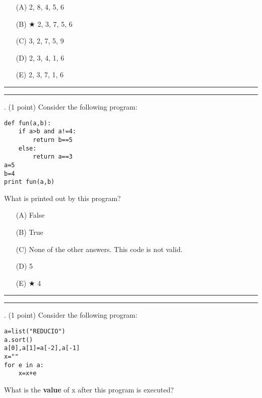 \documentclass{article}
\begin{document}
\begin{enumerate}
\item[(A)]
2, 8, 4, 5, 6

\item[(B)] $\bigstar$ 
2, 3, 7, 5, 6

\item[(C)]
3, 2, 7, 5, 9

\item[(D)]
2, 3, 4, 1, 6

\item[(E)]
2, 3, 7, 1, 6

\end{enumerate}

\vspace*{2em}
\hrule
\vspace{2em}

\vspace{2em}
\hrule height 2pt


\newpage
{}. (1 point)
Consider the following program:
\begin{verbatim}
def fun(a,b):
    if a>b and a!=4:
        return b==5
    else:
        return a==3
a=5
b=4
print fun(a,b)
\end{verbatim}
What is printed out by this program?


\begin{enumerate}
\item[(A)]
False

\item[(B)]
True

\item[(C)]
None of the other answers. This code is not valid.

\item[(D)]
5

\item[(E)] $\bigstar$ 
4

\end{enumerate}

\vspace*{2em}
\hrule
\vspace{2em}

\vspace{2em}
\hrule height 2pt


\newpage
{}. (1 point)
Consider the following program:
\begin{verbatim}
a=list("REDUCIO")
a.sort()
a[0],a[1]=a[-2],a[-1]
x=""
for e in a:
    x=x+e
\end{verbatim}
What is the \textbf{value} of x after this program is executed?
\end{document}
